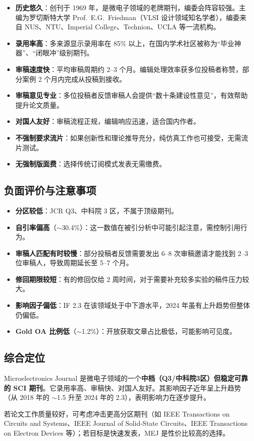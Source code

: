 \documentclass[11pt,a4paper]{article}
\begin{document}
\begin{itemize}
    \item \textbf{历史悠久}：创刊于 1969 年，是微电子领域的老牌期刊，编委会阵容较强。主编为罗切斯特大学 Prof.\ E.G.\ Friedman（VLSI 设计领域知名学者），编委来自 NUS、NTU、Imperial College、Technion、UCLA 等一流机构。
    \item \textbf{录用率高}：多来源显示录用率在 85\% 以上，在国内学术社区被称为``毕业神器''、``闭眼冲''级别期刊。
    \item \textbf{审稿速度快}：平均审稿周期约 2--3 个月。编辑处理效率获多位投稿者称赞，部分案例 2 个月内完成从投稿到接收。
    \item \textbf{审稿意见专业}：多位投稿者反馈审稿人会提供``数十条建设性意见''，有效帮助提升论文质量。
    \item \textbf{对国人友好}：审稿流程正规，编辑响应迅速，适合国内作者。
    \item \textbf{不强制要求流片}：如果创新性和理论推导充分，纯仿真工作也可接受，无需流片测试。
    \item \textbf{无强制版面费}：选择传统订阅模式发表无需缴费。
\end{itemize}

\subsection{负面评价与注意事项}

\begin{itemize}
    \item \textbf{分区较低}：JCR Q3、中科院 3 区，不属于顶级期刊。
    \item \textbf{自引率偏高}（$\sim$30.4\%）：这一数值在被引分析中可能引起注意，需控制引用行为。
    \item \textbf{审稿人匹配有时较慢}：部分投稿者反馈需要发出 6--8 次审稿邀请才能找到 2--3 位审稿人，导致周期延长至 5--7 个月。
    \item \textbf{修回期限较短}：有的修回仅给 2 周时间，对于需要补充较多实验的稿件压力较大。
    \item \textbf{影响因子偏低}：IF 2.3 在该领域处于中下游水平，2024 年虽有上升趋势但整体仍偏低。
    \item \textbf{Gold OA 比例低}（$\sim$1.2\%）：开放获取文章占比极低，可能影响可见度。
\end{itemize}

\subsection{综合定位}

Microelectronics Journal 是微电子领域的一个\textbf{中档（Q3/中科院3区）但稳定可靠的 SCI 期刊}。它录用率高、审稿快、对国人友好。其影响因子近年呈上升趋势（从 2018 年的 $\sim$1.5 升至 2024 年的 2.3），表明影响力在逐步提升。

若论文工作质量较好，可考虑冲击更高分区期刊（如 IEEE Transactions on Circuits and Systems、IEEE Journal of Solid-State Circuits、IEEE Transactions on Electron Devices 等）；若目标是快速发表，MEJ 是性价比较高的选择。
\end{document}
